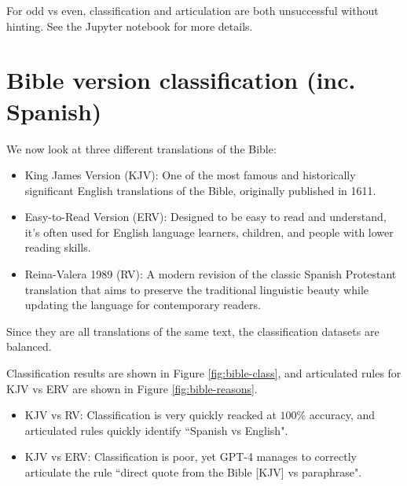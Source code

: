 \documentclass[a4paper, 11pt]{article}
\begin{document}
For odd vs even, classification and articulation are both unsuccessful without hinting. See the Jupyter notebook for more details.


\section{Bible version classification (inc. Spanish)}

We now look at three different translations of the Bible:

\begin{itemize}
	\item King James Version (KJV): One of the most famous and historically significant English translations of the Bible, originally published in 1611.
	\item Easy-to-Read Version (ERV): Designed to be easy to read and understand, it's often used for English language learners, children, and people with lower reading skills.
	\item Reina-Valera 1989 (RV): A modern revision of the classic Spanish Protestant translation that aims to preserve the traditional linguistic beauty while updating the language for contemporary readers.
\end{itemize}

Since they are all translations of the same text, the classification datasets are balanced.

Classification results are shown in Figure \ref{fig:bible-class}, and articulated rules for KJV vs ERV are shown in Figure \ref{fig:bible-reasons}.

\begin{itemize}
	\item KJV vs RV: Classification is very quickly reacked at $100\%$ accuracy, and articulated rules quickly identify ``Spanish vs English".
	\item KJV vs ERV: Classification is poor, yet GPT-4 manages to correctly articulate the rule ``direct quote from the Bible [KJV] vs paraphrase".
\end{itemize}
\end{document}
